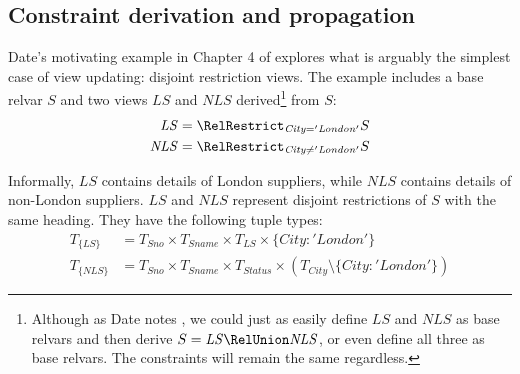 \documentclass{sig-alternate-05-2015}
\newcounter{constraint}
\newcommand{\LS}{\ensuremath{\mathit{LS}}}
\newcommand{\NLS}{\ensuremath{\mathit{NLS}}}
\newcommand{\Sno}{\ensuremath{\mathit{Sno}}}
\newcommand{\Sname}{\ensuremath{\mathit{Sname}}}
\newcommand{\Status}{\ensuremath{\mathit{Status}}}
\newcommand{\City}{\ensuremath{\mathit{City}}}
\newcommand{\T}[1]{\ensuremath{T_{#1}}}
\newcommand{\TT}[1]{\ensuremath{T_{\{#1\}}}}
\newcommand{\CityLondon}{\ensuremath{\{\City\colon\allowbreak\mathit{'London'}\}}}
\newcommand{\TCityMinusLondon}{\ensuremath{\T{\City} \setminus \CityLondon}}
\begin{document}


\subsection{Constraint derivation and propagation}
\label{sec-constraints}

\noindent Date's motivating example in Chapter 4 of \cite{Date.C-2013a-View} explores what is arguably the simplest case of view updating: disjoint restriction views. The example includes a base relvar \(S\) and two views \(\LS\) and \(\NLS\) derived\footnote{Although as Date notes \cite{Date.C-2013a-View}, we could just as easily define \(\LS\) and \(\NLS\) as base relvars and then derive \(S = \LS \RelUnion \NLS\), or even define all three as base relvars. The constraints will remain the same regardless.} from \(S\):
\begin{align}
    \LS  &= \RelRestrict_{\City = \mathit{'London'}}S \label{eqn-ls}   \\
    \NLS &= \RelRestrict_{\City \ne \mathit{'London'}}S \label{eqn-nls}
\end{align}

Informally, \(\LS\) contains details of London suppliers, while \(\NLS\) contains details of non-London suppliers. \(\LS\) and  \(\NLS\) represent disjoint restrictions of \(S\) with the same heading. They have the following tuple types:
\begin{align}
    \TT{\LS}  &= \T{\Sno} \times \T{\Sname} \times \T{\LS} \times \CityLondon \nonumber    \\
    \TT{\NLS} &= \T{\Sno} \times \T{\Sname} \times \T{\Status} \times (\TCityMinusLondon) \nonumber
\end{align}
\end{document}
